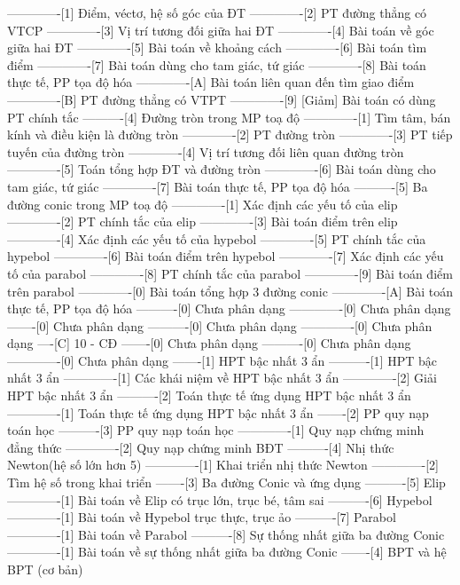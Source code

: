 -------------[1] Điểm, véctơ, hệ số góc của ĐT
-------------[2] PT đường thẳng có VTCP
-------------[3] Vị trí tương đối giữa hai ĐT
-------------[4] Bài toán về góc giữa hai ĐT
-------------[5] Bài toán về khoảng cách
-------------[6] Bài toán tìm điểm
-------------[7] Bài toán dùng cho tam giác, tứ giác
-------------[8] Bài toán thực tế, PP tọa độ hóa
-------------[A] Bài toán liên quan đến tìm giao điểm
-------------[B] PT đường thẳng có VTPT
-------------[9] [Giảm] Bài toán có dùng PT chính tắc
----------[4] Đường tròn trong MP toạ độ
-------------[1] Tìm tâm, bán kính và điều kiện là đường tròn
-------------[2] PT đường tròn
-------------[3] PT tiếp tuyến của đường tròn
-------------[4] Vị trí tương đối liên quan đường tròn
-------------[5] Toán tổng hợp ĐT và đường tròn
-------------[6] Bài toán dùng cho tam giác, tứ giác
-------------[7] Bài toán thực tế, PP tọa độ hóa
----------[5] Ba đường conic trong MP toạ độ
-------------[1] Xác định các yếu tố của elip
-------------[2] PT chính tắc của elip
-------------[3] Bài toán điểm trên elip
-------------[4] Xác định các yếu tố của hypebol
-------------[5] PT chính tắc của hypebol
-------------[6] Bài toán điểm trên hypebol
-------------[7] Xác định các yếu tố của parabol
-------------[8] PT chính tắc của parabol
-------------[9] Bài toán điểm trên parabol
-------------[0] Bài toán tổng hợp 3 đường conic
-------------[A] Bài toán thực tế, PP tọa độ hóa
----------[0] Chưa phân dạng
-------------[0] Chưa phân dạng
-------[0] Chưa phân dạng
----------[0] Chưa phân dạng
-------------[0] Chưa phân dạng
----[C] 10 - CĐ
-------[0] Chưa phân dạng
----------[0] Chưa phân dạng
-------------[0] Chưa phân dạng
-------[1] HPT bậc nhất 3 ẩn
----------[1] HPT bậc nhất 3 ẩn
-------------[1] Các khái niệm về HPT bậc nhất 3 ẩn
-------------[2] Giải HPT bậc nhất 3 ẩn
----------[2] Toán thực tế ứng dụng HPT bậc nhất 3 ẩn
-------------[1] Toán thực tế ứng dụng HPT bậc nhất 3 ẩn
-------[2] PP quy nạp toán học
----------[3] PP quy nạp toán học
-------------[1] Quy nạp chứng minh đẳng thức
-------------[2] Quy nạp chứng minh BĐT
----------[4] Nhị thức Newton(hệ số lớn hơn 5)
-------------[1] Khai triển nhị thức Newton
-------------[2] Tìm hệ số trong khai triển
-------[3] Ba đường Conic và ứng dụng
----------[5] Elip
-------------[1] Bài toán về Elip có trục lớn, trục bé, tâm sai
----------[6] Hypebol
-------------[1] Bài toán về Hypebol trục thực, trục ảo
----------[7] Parabol
-------------[1] Bài toán về Parabol
----------[8] Sự thống nhất giữa ba đường Conic
-------------[1] Bài toán về sự thống nhất giữa ba đường Conic
-------[4] BPT và hệ BPT (cơ bản)
